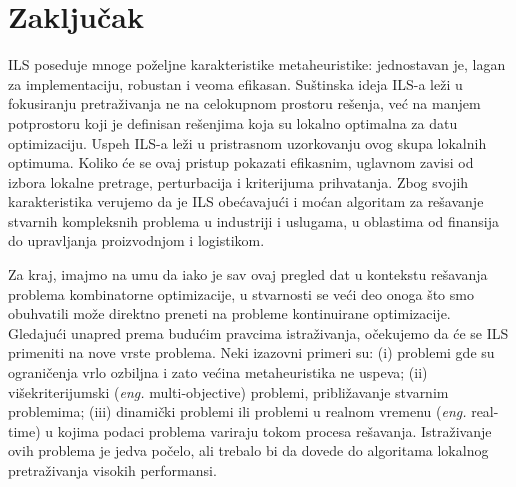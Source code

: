 \documentclass[a4paper]{article}
\newcommand{\eng}[1]{(\textit{eng.} #1)}
\begin{document}
\section{Zaključak}
\label{sec:zakljucak}

ILS poseduje mnoge poželjne karakteristike metaheuristike: jednostavan je, lagan za implementaciju, robustan i veoma efikasan. Suštinska ideja ILS-a leži u fokusiranju pretraživanja ne na celokupnom prostoru rešenja, već na manjem potprostoru koji je definisan rešenjima koja su lokalno optimalna za datu optimizaciju. Uspeh ILS-a leži u pristrasnom uzorkovanju ovog skupa lokalnih optimuma. Koliko će se ovaj pristup pokazati efikasnim, uglavnom zavisi od izbora lokalne pretrage, perturbacija i kriterijuma prihvatanja. Zbog svojih karakteristika verujemo da je ILS obećavajući i moćan algoritam za rešavanje stvarnih kompleksnih problema u industriji i uslugama, u oblastima od finansija do upravljanja proizvodnjom i logistikom.\par
Za kraj, imajmo na umu da iako je sav ovaj pregled dat u kontekstu rešavanja problema kombinatorne optimizacije, u stvarnosti se veći deo onoga što smo obuhvatili može direktno preneti na probleme kontinuirane optimizacije. Gledajući unapred prema budućim pravcima istraživanja, očekujemo da će se ILS primeniti na nove vrste problema. Neki izazovni primeri su: (i) problemi gde su ograničenja vrlo ozbiljna i zato većina metaheuristika ne uspeva; (ii) višekriterijumski \eng{multi-objective} problemi, približavanje stvarnim problemima; (iii) dinamički problemi ili problemi u realnom vremenu \eng{real-time} u kojima podaci problema variraju tokom procesa rešavanja.
Istraživanje ovih problema je jedva počelo, ali trebalo bi da dovede do algoritama lokalnog pretraživanja visokih performansi.



\appendix
 

\end{document}
